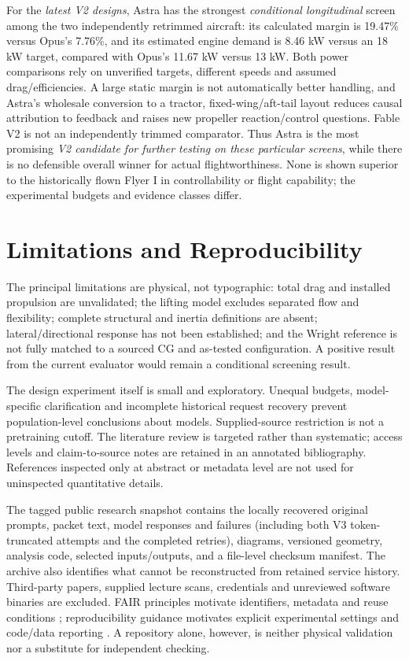 \documentclass[11pt,a4paper]{article}
\begin{document}
For the \emph{latest V2 designs}, Astra has the strongest \emph{conditional longitudinal} screen among the two independently retrimmed aircraft: its calculated margin is 19.47\% versus Opus's 7.76\%, and its estimated engine demand is 8.46 kW versus an 18 kW target, compared with Opus's 11.67 kW versus 13 kW. Both power comparisons rely on unverified targets, different speeds and assumed drag/efficiencies. A large static margin is not automatically better handling, and Astra's wholesale conversion to a tractor, fixed-wing/aft-tail layout reduces causal attribution to feedback and raises new propeller reaction/control questions. Fable V2 is not an independently trimmed comparator. Thus Astra is the most promising \emph{V2 candidate for further testing on these particular screens}, while there is no defensible overall winner for actual flightworthiness. None is shown superior to the historically flown Flyer I in controllability or flight capability; the experimental budgets and evidence classes differ.

\section{Limitations and Reproducibility}
The principal limitations are physical, not typographic: total drag and installed propulsion are unvalidated; the lifting model excludes separated flow and flexibility; complete structural and inertia definitions are absent; lateral/directional response has not been established; and the Wright reference is not fully matched to a sourced CG and as-tested configuration. A positive result from the current evaluator would remain a conditional screening result.

The design experiment itself is small and exploratory. Unequal budgets, model-specific clarification and incomplete historical request recovery prevent population-level conclusions about models. Supplied-source restriction is not a pretraining cutoff. The literature review is targeted rather than systematic; access levels and claim-to-source notes are retained in an annotated bibliography. References inspected only at abstract or metadata level are not used for uninspected quantitative details.

The tagged public research snapshot contains the locally recovered original prompts, packet text, model responses and failures (including both V3 token-truncated attempts and the completed retries), diagrams, versioned geometry, analysis code, selected inputs/outputs, and a file-level checksum manifest. The archive also identifies what cannot be reconstructed from retained service history. Third-party papers, supplied lecture scans, credentials and unreviewed software binaries are excluded. FAIR principles motivate identifiers, metadata and reuse conditions \cite{ref33}; reproducibility guidance motivates explicit experimental settings and code/data reporting \cite{ref34}. A repository alone, however, is neither physical validation nor a substitute for independent checking.
\end{document}
